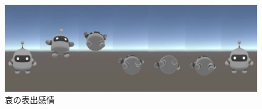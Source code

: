 \vspace{1cm}
 \begin{figure}[!h]
 \begin{center}
  \centering
  \includegraphics[width=12cm]{images/chapter3/sad.eps}
  \caption{哀の表出感情}
  \label{sad}
 \end{center}
\end{figure}

\newpage


















